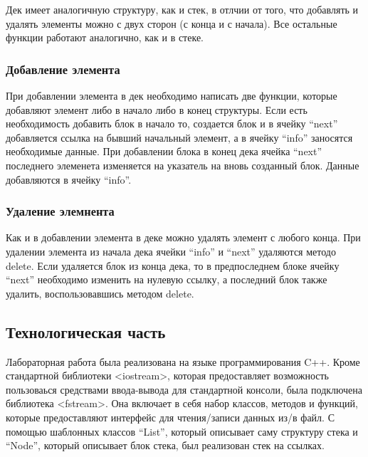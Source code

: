 \documentclass[12pt, a4paper]{article}
\begin{document}
Дек имеет аналогичную структуру, как и стек, в отлчии от того, что добавлять и удалять элементы можно с двух сторон (с конца и с начала). Все остальные функции работают аналогично, как и в стеке.

\subsubsection{Добавление элемента}
При добавлении элемента в дек необходимо написать две функции, которые добавляют элемент либо в начало либо в конец структуры. Если есть необходимость добавить блок в начало то, создается блок и в ячейку ``next'' добавляется ссылка на бывший начальный элемент, а в ячейку ``info'' заносятся необходимые данные. При добавлении блока в конец дека ячейка ``next'' последнего элеменета изменяется на указатель на вновь созданный блок. Данные добавляются в ячейку ``info''.

\subsubsection{Удаление элемнента}
Как и в добавлении элемента в деке можно удалять элемент с любого конца. При удалении элемента из начала дека ячейки ``info'' и ``next'' удаляются методо delete. Если удаляется блок из конца дека, то в предпоследнем блоке ячейку ``next'' необходимо изменить на нулевую ссылку, а последний блок также удалить, воспользовавшись методом delete. 

\newpage
\begin{center}
    \section{Технологическая часть}
\end{center}
Лабораторная работа была реализована на языке программирования C++. Кроме стандартной библиотеки <iostream>, которая предоставляет возможность пользоваься средствами ввода-вывода для стандартной консоли, была подключена библиотека <fstream>. Она включает в себя набор классов, методов и функций, которые предоставляют интерфейс для чтения/записи данных из/в файл. С помощью шаблонных классов ``List'', который описывает саму структуру стека и ``Node'', который описывает блок стека, был реализован стек на ссылках. 
\end{document}
